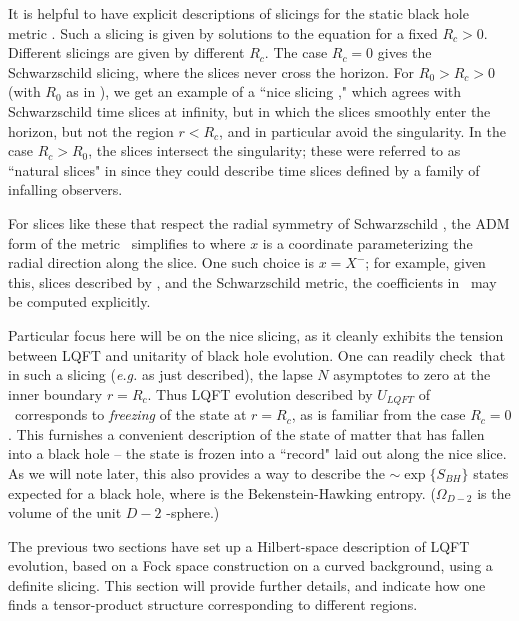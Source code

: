
It is helpful to have explicit descriptions of slicings for the static black hole metric \schmet. Such a slicing is given by solutions to the equation
%
\eqn{}
%
for a fixed $R_c>0$.  Different slicings are given by different $R_c$.  The case $R_c=0$ gives the Schwarzschild slicing, where the slices never cross the horizon.  For $R_0>R_c>0$ (with $R_0$ as in \singcurv), we get an example of a ``nice slicing ," which agrees with Schwarzschild time slices at infinity, but in which the slices smoothly enter the horizon, but not the region $r<R_c$, and in particular avoid the singularity.  In the case $R_c>R_0$, the slices intersect the singularity; these were referred to as ``natural slices" in  since they could describe time slices defined by a family of infalling observers.

For slices like these that respect the radial symmetry of Schwarzschild \schmet, the ADM form of the metric \admdec\ simplifies to
%
\eqn{}
%
where $x$ is a coordinate parameterizing the radial direction along the slice.  One such choice is $x=X^-$; for example, given this, slices described by \sldef, and the Schwarzschild metric, the coefficients in \admrad\ may be computed explicitly.


Particular focus here will be on the nice slicing, as it cleanly exhibits the tension between LQFT and unitarity of black hole evolution.  One can readily check\QBHB\ that in such a slicing ({\it e.g.} as just described), the lapse $N$ asymptotes to zero at the inner boundary $r=R_c$.  Thus LQFT evolution described by $U_{LQFT}$ of \unitop\ corresponds to {\it freezing} of the state at $r=R_c$, as is familiar from the case $R_c=0$.  This furnishes a convenient description of the state of matter that has fallen into a black hole -- the state is frozen into a ``record" laid out along the nice slice.   As we will note later, this also provides a way to describe the $\sim \exp\{S_{BH}\}$ states expected for a black hole,
where 
%
\eqn{}
%
is the Bekenstein-Hawking entropy.  ($\Omega_{D-2}$ is the volume of the unit $D-2$ -sphere.)


The previous two sections have set up a Hilbert-space description of LQFT evolution, based on a Fock space construction on a curved background, using a definite slicing.  This section will provide further details, and indicate how one finds a tensor-product structure corresponding to different regions.

